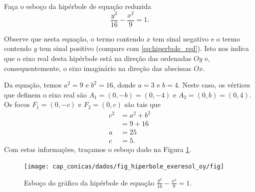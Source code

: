 \begin{exeresol}
  Faça o esboço da hipérbole de equação reduzida
  \begin{equation}
    \frac{y^2}{16} - \frac{x^2}{9} = 1.
  \end{equation}
\end{exeresol}
\begin{resol}
  Observe que nesta equação, o termo contendo $x$ tem sinal negativo e o termo contendo $y$ tem sinal positivo (compare com \eqref{eq:hiperbole_red}). Isto nos indica que o eixo real desta hipérbole está na direção das ordenadas $Oy$ e, consequentemente, o eixo imaginário na direção das abscissas $Ox$.

  Da equação, temos $a^2 = 9$ e $b^2=16$, donde $a=3$ e $b=4$. Neste caso, os vértices que definem o eixo real são $A_1=(0, -b)=(0, -4)$ e $A_2=(0, b)=(0, 4)$. Os focos $F_1=(0, -c)$ e $F_2=(0, c)$ são tais que
  \begin{align}
    c^2 &= a^2 + b^2 \\
        &= 9 + 16 \\a
        &= 25 \\
    c &= 5.
  \end{align}
  Com estas informações, traçamos o esboço dado na Figura \ref{fig:hiperbole_exeresol_oy}.

  \begin{figure}[H]
    \centering
    \texttt{[image: cap\_conicas/dados/fig\_hiperbole\_exeresol\_oy/fig]}
    \caption{Esboço do gráfico da hipérbole de equação $\displaystyle\frac{y^2}{16}-\frac{x^2}{9}=1$.}
    \label{fig:hiperbole_exeresol_oy}
  \end{figure}   
\end{resol}

